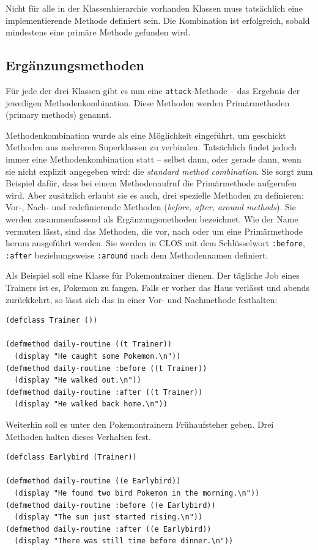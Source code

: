 Nicht für alle in der Klassenhierarchie vorhanden Klassen muss tatsächlich eine implementierende Methode definiert sein. Die Kombination ist erfolgreich, sobald mindestens eine primäre Methode gefunden wird.

\subsection{Ergänzungsmethoden}
\label{ergmeth}
Für jede der drei Klassen gibt es nun eine \texttt{attack}-Methode -- das Ergebnis der jeweiligen Methodenkombination. Diese Methoden werden Primärmethoden (primary methods) genannt.

Methodenkombination wurde als eine Möglichkeit eingeführt, um geschickt Methoden aus mehreren Superklassen zu verbinden. Tatsächlich findet jedoch immer eine Methodenkombination statt -- selbst dann, oder gerade dann, wenn sie nicht explizit angegeben wird: die \textit{standard method combination}. Sie sorgt zum Beispiel dafür, dass bei einem Methodenaufruf die Primärmethode aufgerufen wird. Aber zusätzlich erlaubt sie es auch, drei spezielle Methoden zu definieren: Vor-, Nach- und redefinierende Methoden (\emph{before, after, around methods}). Sie werden zusammenfassend als Ergänzungsmethoden  bezeichnet. Wie der Name vermuten lässt, sind das Methoden, die vor, nach oder um eine Primärmethode herum ausgeführt werden. Sie werden in CLOS mit dem Schlüsselwort \texttt{:before}, \texttt{:after} beziehungsweise \texttt{:around} nach dem Methodennamen definiert.

Als Beispiel soll eine Klasse für Pokemontrainer dienen. Der tägliche Job eines Trainers ist es, Pokemon zu fangen. Falls er vorher das Haus verlässt und abends zurückkehrt, so lässt sich das in einer Vor- und Nachmethode festhalten:

\begin{lstlisting}
(defclass Trainer ())

(defmethod daily-routine ((t Trainer))
  (display "He caught some Pokemon.\n"))
(defmethod daily-routine :before ((t Trainer))
  (display "He walked out.\n"))
(defmethod daily-routine :after ((t Trainer))
  (display "He walked back home.\n"))
\end{lstlisting}

Weiterhin soll es unter den Pokemontrainern Frühaufsteher geben. Drei Methoden halten dieses Verhalten fest.

\begin{lstlisting}
(defclass Earlybird (Trainer))

(defmethod daily-routine ((e Earlybird))
  (display "He found two bird Pokemon in the morning.\n"))
(defmethod daily-routine :before ((e Earlybird))
  (display "The sun just started rising.\n"))
(defmethod daily-routine :after ((e Earlybird))
  (display "There was still time before dinner.\n"))
\end{lstlisting}

